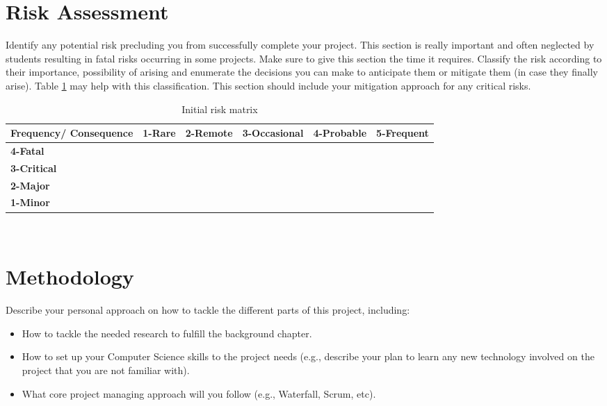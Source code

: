 \section{Risk Assessment}
Identify any potential risk precluding you from successfully complete your project. This section is really important and often neglected by students resulting in fatal risks occurring in some projects. Make sure to give this section the time it requires. Classify the risk according to their importance, possibility of arising and enumerate the decisions you can make to anticipate them or mitigate them (in case they finally arise). Table \ref{tab:ProjRisks} may help with this classification. This section should include your mitigation approach for any critical risks.

\begin{table}[h]
\centering
\scriptsize
\caption{Initial risk matrix}
\begin{tabular}{|p{2cm}|p{2cm}|p{2cm}| p{2cm} |p{2cm}| p{2cm}|}
\hline \bf Frequency/ Consequence & \bf 1-Rare & \bf 2-Remote & \bf 3-Occasional & \bf 4-Probable & \bf 5-Frequent\\ [10pt]

\hline \bf 4-Fatal & \cellcolor{yellow!50} & \cellcolor{red!50} & \cellcolor{red!50} & \cellcolor{red!50} &\cellcolor{red!50} \\ [10pt]

\hline \bf 3-Critical &\cellcolor{green!50} & \cellcolor{yellow!50} & \cellcolor{yellow!50} & \cellcolor{red!50} &\cellcolor{red!50} \\ [10pt]

\hline \bf 2-Major & \cellcolor{green!50} & \cellcolor{green!50} & \cellcolor{yellow!50} &\cellcolor{yellow!50} &\cellcolor{red!50} \\ [10pt]

\hline \bf 1-Minor & \cellcolor{green!50} & \cellcolor{green!50} & \cellcolor{green!50} &\cellcolor{yellow!50} &\cellcolor{yellow!50} \\ [10pt]
\hline
\end{tabular} \\
\label{tab:ProjRisks}
\end{table}

\section{Methodology}
Describe your personal approach on how to tackle the different parts of this project, including:
\begin{itemize}
    \item How to tackle the needed research to fulfill the background chapter. 
    \item How to set up your Computer Science skills to the project needs (e.g., describe your plan to learn any new technology involved on the project that you are not familiar with). 
    \item What core project managing approach will you follow (e.g., Waterfall, Scrum, etc).
\end{itemize}

